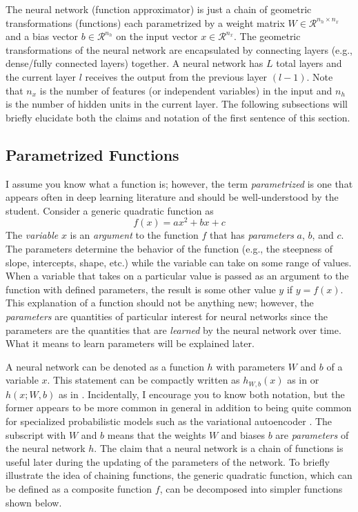 \documentclass{article}
\begin{document}
\quad The neural network (function approximator) is just a chain of geometric transformations (functions)
each parametrized by a weight matrix $W \in \mathcal{R}^{n_h \times n_x}$ and
a bias vector $b \in \mathcal{R}^{n_h}$ on the input vector $x \in \mathcal{R}^{n_x}$.
The geometric transformations of the neural network are encapsulated by connecting
layers (e.g., dense/fully connected layers) together. A neural network has $L$ total
layers and the current layer $l$ receives the output from the previous layer $(l-1)$.
Note that $n_x$ is the number of features (or independent variables) in the input
and $n_h$ is the number of hidden units in the current layer. The following subsections will
briefly elucidate both the claims and notation of the first sentence of this section.

\subsection{Parametrized Functions}

\quad I assume you know what a function is; however, the term \textit{parametrized}
is one that appears often in deep learning literature and should be well-understood by the student.
Consider a generic quadratic function \cite{MathSEVarsParamsArgs2015} as
\begin{equation}
	f(x) = ax^{2} + bx + c
\end{equation}
The \textit{variable} $x$ is an \textit{argument} to the function $f$ that has
\textit{parameters} $a$, $b$, and $c$. The parameters determine the behavior of
the function (e.g., the steepness of slope, intercepts, shape, etc.) while the
variable can take on some range of values. When a variable that takes on a particular
value is passed as an argument to the function with defined parameters, the result
is some other value $y$ if $y = f(x)$. This explanation of a function
should not be anything new; however, the \textit{parameters} are quantities
of particular interest for neural networks since the parameters are the quantities
that are \textit{learned} by the neural network over time. What it means to learn
parameters will be explained later.

A neural network can be denoted as a function $h$ with parameters $W$
and $b$ of a variable $x$. This statement can be compactly written as
$h_{W, b}(x)$ as in \cite{Geron2020} or $h(x; W, b)$ as in \cite{Goodfellow2016}.
Incidentally, I encourage you to know both notation, but the former appears to be more common
in general in addition to being quite common for specialized
probabilistic models such as the variational autoencoder \cite{Kingma2014}.
The subscript with $W$ and $b$ means that the weights $W$ and biases $b$ are
\textit{parameters } of the neural network $h$.
The claim that a neural network is a chain of functions is useful later during
the updating of the parameters of the network. To briefly illustrate the idea
of chaining functions, the generic quadratic function, which can be defined
as a composite function $f$, can be decomposed into simpler functions shown
below.
\end{document}
